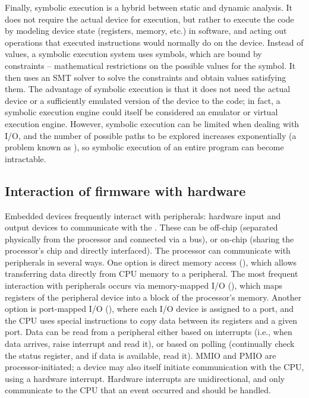 Finally, symbolic execution is a hybrid between static and dynamic analysis.
It does not require the actual device for execution, but rather  to execute the code by modeling device state (registers, memory, etc.) in software, and acting out operations that executed instructions would normally do on the device.
Instead of values, a symbolic execution system uses symbols, which are bound by constraints -- mathematical restrictions on the possible values for the symbol.
It then uses an SMT solver to solve the constraints and obtain values satisfying them.
The advantage of symbolic execution is that it does not need the actual device or a sufficiently emulated version of the device to  the code; in fact, a symbolic execution engine could itself be considered an emulator or virtual execution engine.
However, symbolic execution can be limited when dealing with I/O, and the number of possible paths to be explored increases exponentially (a problem known as ), so symbolic execution of an entire program can become intractable.

\subsection{Interaction of firmware with hardware}
Embedded devices frequently interact with peripherals: hardware input and output devices to communicate with the .
These can be off-chip (separated physically from the processor and connected via a bus), or on-chip (sharing the processor's chip and directly interfaced).
The processor can communicate with peripherals in several ways.
One option is direct memory access (), which allows transferring data directly from CPU memory to a peripheral.
The most frequent interaction with peripherals occurs via memory-mapped I/O (), which maps registers of the peripheral device into a block of the processor's memory.
Another option is port-mapped I/O (), where each I/O device is assigned to a port, and the CPU uses special instructions to copy data between its registers and a given port.
Data can be read from a peripheral either based on interrupts (i.e., when data arrives, raise interrupt and read it), or based on polling (continually check the status register, and if data is available, read it).
MMIO and PMIO are processor-initiated; a device may also itself initiate communication with the CPU, using a hardware interrupt.
Hardware interrupts are unidirectional, and only communicate to the CPU that an event occurred and should be handled.
